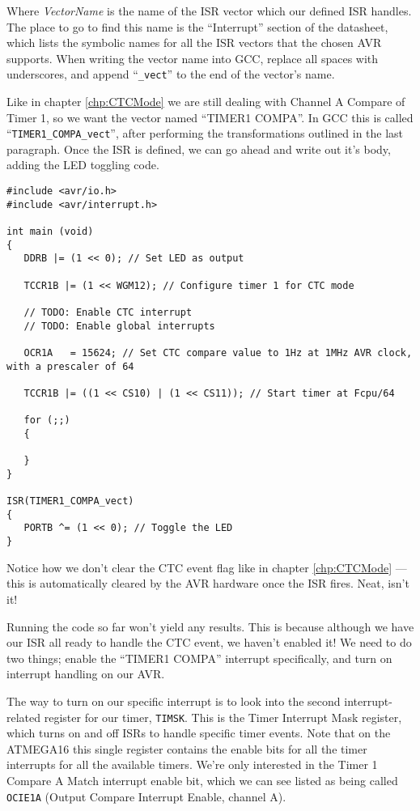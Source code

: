 \documentclass[a4paper,oneside,notitlepage]{book}
\begin{document}
Where \emph{VectorName} is the name of the ISR vector which our defined ISR handles. The place to go to find this name is the ``Interrupt'' section of the datasheet, which lists the symbolic names for all the ISR vectors that the chosen AVR supports. When writing the vector name into GCC, replace all spaces with underscores, and append ``\texttt{\_vect}'' to the end of the vector's name.

Like in chapter \ref{chp:CTCMode} we are still dealing with Channel A Compare of Timer 1, so we want the vector named ``TIMER1 COMPA''. In GCC this is called ``\texttt{TIMER1\_COMPA\_vect}'', after performing the transformations outlined in the last paragraph. Once the ISR is defined, we can go ahead and write out it's body, adding the LED toggling code.

\begin{center}
\begin{lstlisting}
#include <avr/io.h>
#include <avr/interrupt.h>

int main (void)
{
   DDRB |= (1 << 0); // Set LED as output

   TCCR1B |= (1 << WGM12); // Configure timer 1 for CTC mode

   // TODO: Enable CTC interrupt
   // TODO: Enable global interrupts

   OCR1A   = 15624; // Set CTC compare value to 1Hz at 1MHz AVR clock, with a prescaler of 64

   TCCR1B |= ((1 << CS10) | (1 << CS11)); // Start timer at Fcpu/64

   for (;;)
   {

   }
}

ISR(TIMER1_COMPA_vect)
{
   PORTB ^= (1 << 0); // Toggle the LED
}
\end{lstlisting}
\end{center}

Notice how we don't clear the CTC event flag like in chapter \ref{chp:CTCMode} --- this is automatically cleared by the AVR hardware once the ISR fires. Neat, isn't it!

Running the code so far won't yield any results. This is because although we have our ISR all ready to handle the CTC event, we haven't enabled it! We need to do two things; enable the ``TIMER1 COMPA'' interrupt specifically, and turn on interrupt handling on our AVR.

The way to turn on our specific interrupt is to look into the second interrupt-related register for our timer, \texttt{TIMSK}. This is the Timer Interrupt Mask register, which turns on and off ISRs to handle specific timer events. Note that on the ATMEGA16 this single register contains the enable bits for all the timer interrupts for all the available timers. We're only interested in the Timer 1 Compare A Match interrupt enable bit, which we can see listed as being called \texttt{OCIE1A} (Output Compare Interrupt Enable, channel A).
\end{document}
